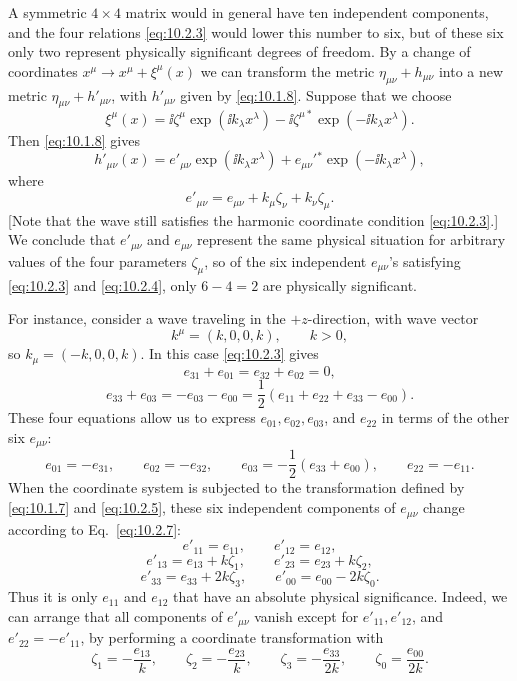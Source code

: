 A symmetric \(4\times4\) matrix would in general have ten independent
components, and the four relations \eqref{eq:10.2.3} would lower this number
to six, but of these six only two represent physically significant degrees
of freedom. By a change of coordinates
\(x^\mu\to x^\mu+\xi^\mu(x)\) we can transform the metric
\(\eta_{\mu\nu}+h_{\mu\nu}\) into a new metric
\(\eta_{\mu\nu}+h'_{\mu\nu}\), with \(h'_{\mu\nu}\) given by
\eqref{eq:10.1.8}. Suppose that we choose
\begin{equation}
  \xi^\mu(x)
  =
  \ii\zeta^\mu\exp(\ii k_\lambda x^\lambda)
  -\ii\zeta^{\mu*}\exp(-\ii k_\lambda x^\lambda).
  \tag{10.2.5}\label{eq:10.2.5}
\end{equation}
Then \eqref{eq:10.1.8} gives
\begin{equation}
  h'_{\mu\nu}(x)
  =
  e'_{\mu\nu}\exp(\ii k_\lambda x^\lambda)
  +e_{\mu\nu}'{}^*\exp(-\ii k_\lambda x^\lambda),
  \tag{10.2.6}\label{eq:10.2.6}
\end{equation}
where
\begin{equation}
  e'_{\mu\nu}
  =
  e_{\mu\nu}+k_\mu\zeta_\nu+k_\nu\zeta_\mu.
  \tag{10.2.7}\label{eq:10.2.7}
\end{equation}
[Note that the wave still satisfies the harmonic coordinate condition
\eqref{eq:10.2.3}.] We conclude that \(e'_{\mu\nu}\) and \(e_{\mu\nu}\)
represent the same physical situation for arbitrary values of the four
parameters \(\zeta_\mu\), so of the six independent \(e_{\mu\nu}\)'s
satisfying \eqref{eq:10.2.3} and \eqref{eq:10.2.4}, only
\(6-4=2\) are physically significant.

For instance, consider a wave traveling in the \(+z\)-direction, with wave
vector
\begin{equation}
  k^\mu=(k,0,0,k),
  \qquad k>0,
  \tag{10.2.8}\label{eq:10.2.8}
\end{equation}
so \(k_\mu=(-k,0,0,k)\). In this case \eqref{eq:10.2.3} gives
\[
  e_{31}+e_{01}=e_{32}+e_{02}=0,
\]
\[
  e_{33}+e_{03}
  =
  -e_{03}-e_{00}
  =
  \frac12(e_{11}+e_{22}+e_{33}-e_{00}).
\]
These four equations allow us to express \(e_{01},e_{02},e_{03}\), and
\(e_{22}\) in terms of the other six \(e_{\mu\nu}\):
\begin{equation}
  e_{01}=-e_{31},
  \qquad
  e_{02}=-e_{32},
  \qquad
  e_{03}=-\frac12(e_{33}+e_{00}),
  \qquad
  e_{22}=-e_{11}.
  \tag{10.2.9}\label{eq:10.2.9}
\end{equation}
When the coordinate system is subjected to the transformation defined by
\eqref{eq:10.1.7} and \eqref{eq:10.2.5}, these six independent components
of \(e_{\mu\nu}\) change according to Eq.~\eqref{eq:10.2.7}:
\[
  e'_{11}=e_{11},\qquad e'_{12}=e_{12},
\]
\[
  e'_{13}=e_{13}+k\zeta_1,\qquad
  e'_{23}=e_{23}+k\zeta_2,
\]
\[
  e'_{33}=e_{33}+2k\zeta_3,\qquad
  e'_{00}=e_{00}-2k\zeta_0.
\]
Thus it is only \(e_{11}\) and \(e_{12}\) that have an absolute physical
significance. Indeed, we can arrange that all components of
\(e'_{\mu\nu}\) vanish except for \(e'_{11},e'_{12}\), and
\(e'_{22}=-e'_{11}\), by performing a coordinate transformation with
\[
  \zeta_1=-\frac{e_{13}}{k},\qquad
  \zeta_2=-\frac{e_{23}}{k},\qquad
  \zeta_3=-\frac{e_{33}}{2k},\qquad
  \zeta_0=\frac{e_{00}}{2k}.
\]

